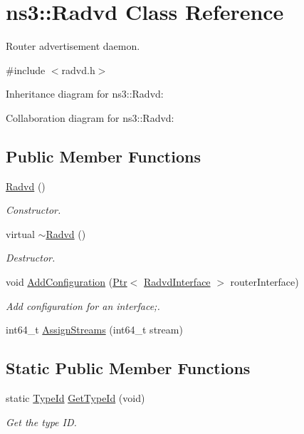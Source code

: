 \hypertarget{classns3_1_1Radvd}{}\section{ns3\+:\+:Radvd Class Reference}
\label{classns3_1_1Radvd}


Router advertisement daemon.  




{\ttfamily \#include $<$radvd.\+h$>$}



Inheritance diagram for ns3\+:\+:Radvd\+:


Collaboration diagram for ns3\+:\+:Radvd\+:
\subsection*{Public Member Functions}
\begin{DoxyCompactItemize}
\item 
\hyperlink{classns3_1_1Radvd_af36276e5f272a43d096fc0ffeedb3895}{Radvd} ()
\begin{DoxyCompactList}\small\item\em Constructor. \end{DoxyCompactList}\item 
virtual \hyperlink{classns3_1_1Radvd_ae5532bf44bb47d007ed5d30b6b0ea45a}{$\sim$\+Radvd} ()
\begin{DoxyCompactList}\small\item\em Destructor. \end{DoxyCompactList}\item 
void \hyperlink{classns3_1_1Radvd_ac6582327e32dc8332ba34a0ec0709d1c}{Add\+Configuration} (\hyperlink{classns3_1_1Ptr}{Ptr}$<$ \hyperlink{classns3_1_1RadvdInterface}{Radvd\+Interface} $>$ router\+Interface)
\begin{DoxyCompactList}\small\item\em Add configuration for an interface;. \end{DoxyCompactList}\item 
int64\+\_\+t \hyperlink{classns3_1_1Radvd_a9a7b0ce4a4f44ee5aa7bc8a9af1b2bbe}{Assign\+Streams} (int64\+\_\+t stream)
\end{DoxyCompactItemize}
\subsection*{Static Public Member Functions}
\begin{DoxyCompactItemize}
\item 
static \hyperlink{classns3_1_1TypeId}{Type\+Id} \hyperlink{classns3_1_1Radvd_a570bf39207fffeb2caaed5b41faa0ce1}{Get\+Type\+Id} (void)
\begin{DoxyCompactList}\small\item\em Get the type ID. \end{DoxyCompactList}\end{DoxyCompactItemize}
